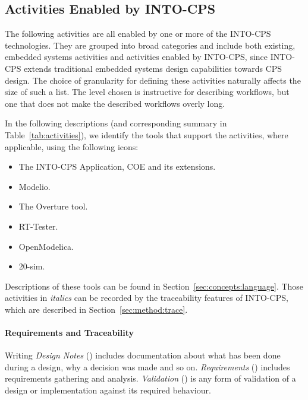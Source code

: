 \subsection{Activities Enabled by INTO-CPS}
\label{sec:method:workflows}
The following activities are all enabled by one or more of the INTO-CPS technologies. They are grouped into broad categories and include both existing, embedded systems activities and activities enabled by INTO-CPS, since INTO-CPS extends traditional embedded systems design capabilities towards CPS design. The choice of granularity for defining these activities naturally affects the size of such a list. The level chosen is instructive for describing workflows, but one that does not make the described workflows overly long.  %

In the following descriptions (and corresponding summary in Table~\ref{tab:activities}), we identify the tools that support the activities, where applicable, using the following icons:

\begin{itemize}[noitemsep]
\item[\INTOCPS] The INTO-CPS Application, COE and its extensions.
\item[\Modelio] Modelio.
\item[\Overture] The Overture tool.
\item[\RTTester] RT-Tester.
\item[\OpenModelica] OpenModelica.
\item[\TwentySim] 20-sim.
\end{itemize}

Descriptions of these tools can be found in Section~\ref{sec:concepts:language}. Those activities in \emph{italics} can be recorded by the traceability features of INTO-CPS, which are described in Section~\ref{sec:method:trace}.

\newpage
\paragraph{Requirements and Traceability}

Writing \emph{Design Notes} (\INTOCPS) includes documentation about what has been done during a design, why a decision was made and so on. \emph{Requirements} (\Modelio) includes requirements gathering and analysis. \emph{Validation} (\INTOCPS) is any form of validation of a design or implementation against its required behaviour.

